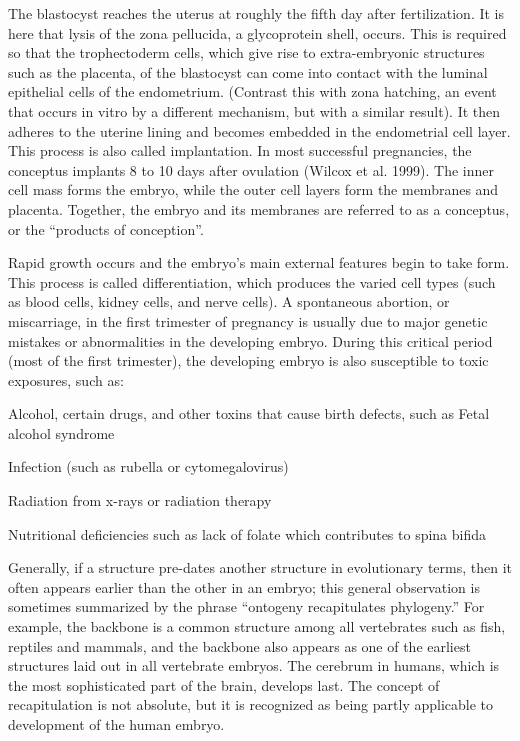 \documentclass[12pt,a4paper,onecolumn]{article}
\begin{document}
The blastocyst reaches the uterus at roughly the fifth day after fertilization. It is here that
lysis of the zona pellucida, a glycoprotein shell, occurs. This is required so that the
trophectoderm cells, which give rise to extra-embryonic structures such as the placenta, of the
blastocyst can come into contact with the luminal epithelial cells of the endometrium. (Contrast
this with zona hatching, an event that occurs in vitro by a different mechanism, but with a similar
result). It then adheres to the uterine lining and becomes embedded in the endometrial cell layer.
This process is also called implantation. In most successful pregnancies, the conceptus implants 8
to 10 days after ovulation (Wilcox et al. 1999). The inner cell mass forms the embryo, while the
outer cell layers form the membranes and placenta. Together, the embryo and its membranes are
referred to as a conceptus, or the ``products of conception''.

Rapid growth occurs and the embryo's main external features begin to take form. This process is
called differentiation, which produces the varied cell types (such as blood cells, kidney cells, and
nerve cells). A spontaneous abortion, or miscarriage, in the first trimester of pregnancy is usually
due to major genetic mistakes or abnormalities in the developing embryo. During this critical period
(most of the first trimester), the developing embryo is also susceptible to toxic exposures, such
as:
\begin{wuxch_item}
    \item Alcohol, certain drugs, and other toxins that cause birth defects, such as Fetal alcohol syndrome
    \item Infection (such as rubella or cytomegalovirus)
    \item Radiation from x-rays or radiation therapy
    \item Nutritional deficiencies such as lack of folate which contributes to spina bifida
\end{wuxch_item}

Generally, if a structure pre-dates another structure in evolutionary terms, then it often appears
earlier than the other in an embryo; this general observation is sometimes summarized by the phrase
``ontogeny recapitulates phylogeny.'' For example, the backbone is a common structure among all
vertebrates such as fish, reptiles and mammals, and the backbone also appears as one of the earliest
structures laid out in all vertebrate embryos. The cerebrum in humans, which is the most
sophisticated part of the brain, develops last. The concept of recapitulation is not absolute, but
it is recognized as being partly applicable to development of the human embryo.
\end{document}
